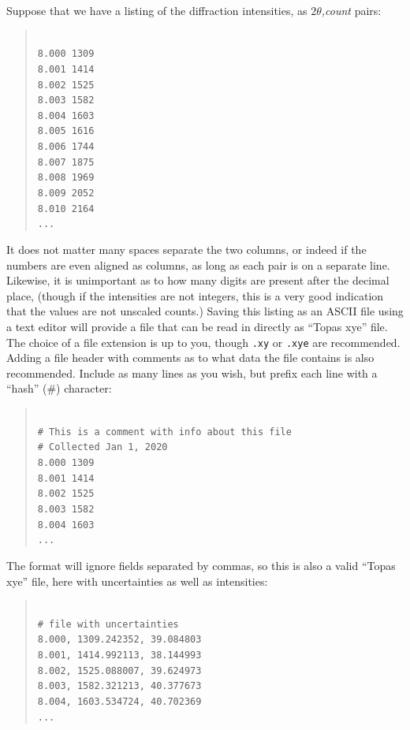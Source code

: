 Suppose that we have a listing of the diffraction intensities, as \textit{$2\theta$,count} pairs: 
\begin{quote}
\texttt{\\
 8.000 1309 \\
 8.001 1414 \\
 8.002 1525 \\
 8.003 1582 \\
 8.004 1603 \\
 8.005 1616 \\
 8.006 1744 \\
 8.007 1875 \\
 8.008 1969 \\
 8.009 2052 \\ 
 8.010 2164 \\ 
 ...\\
}\end{quote}
It does not matter many spaces separate the two columns, or indeed if the numbers are even aligned as columns, as long as each pair is on a separate line. Likewise, it is unimportant as to how many digits are present after the decimal place, (though if the intensities are not integers, this is a very good indication that the values are not unscaled counts.) Saving this listing as an ASCII file using a text editor will provide a file that can be read in directly as ``Topas xye'' file. The choice of a file extension is up to you, though \texttt{.xy} or \texttt{.xye} are recommended. Adding a file header with comments as to what data the file contains is also recommended. Include as many lines as you wish, but prefix each line with a ``hash'' (\#) character:
\begin{quote}
\texttt{\\
\# This is a comment with info about this file\\
\# Collected Jan 1, 2020\\
 8.000 1309 \\
 8.001 1414 \\
 8.002 1525 \\
 8.003 1582 \\
 8.004 1603 \\
...\\
}
\end{quote}
The format will ignore fields separated by commas, so this is also a valid ``Topas xye'' file, here with uncertainties as well as intensities:
\begin{quote}
\texttt{\\
\# file with uncertainties\\
 8.000, 1309.242352, 39.084803\\
 8.001, 1414.992113, 38.144993\\
 8.002, 1525.088007, 39.624973\\
 8.003, 1582.321213, 40.377673\\
 8.004, 1603.534724, 40.702369\\
...\\
}
\end{quote}


